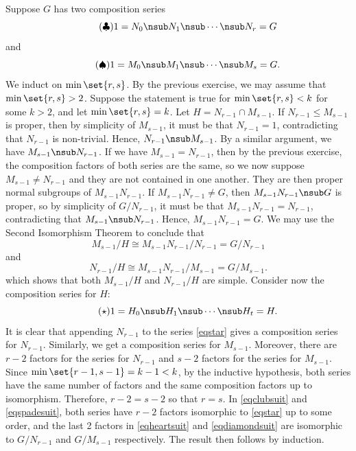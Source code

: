 \begin{sol}
    Suppose $G$ has two composition series
    \begin{equation}
        \label{eqclubsuit}
        \tag{$\clubsuit$}
        1 = N_0 \nsub N_1 \nsub \cdots \nsub N_r = G
    \end{equation}
    and
    \begin{equation}
        \label{eqspadesuit}
        \tag{$\spadesuit$}
        1 = M_0 \nsub M_1 \nsub \cdots \nsub M_s = G.
    \end{equation}
    We induct on $\min\set{r,s}$.
	By the previous exercise, we may assume that $\min\set{r, s} > 2$.
	Suppose the statement is true for $\min\set{r, s} < k$ for some $k > 2$, and let $\min\set{r, s} = k$.
	Let $H = N_{r - 1} \cap M_{s - 1}$.
	If $N_{r - 1} \leq M_{s - 1}$ is proper, then by simplicity of $M_{s - 1}$, it must be that $N_{r - 1} = 1$, contradicting that $N_{r - 1}$ is non-trivial.
	Hence, $N_{r - 1} \nsub M_{s - 1}$.
	By a similar argument, we have $M_{s - 1} \nsub N_{r - 1}$.
	If we have $M_{s - 1} = N_{r - 1}$, then by the previous exercise, the composition factors of both series are the same, so we now suppose $M_{s - 1} \neq N_{r - 1}$ and they are not contained 
    in one another.
	They are then proper normal subgroups of $M_{s - 1}N_{r - 1}$.
	If $M_{s - 1}N_{r - 1} \neq G$, then $M_{s - 1}N_{r - 1} \nsub G$ is proper, so by simplicity of $G/N_{r - 1}$, it must be that $M_{s - 1}N_{r - 1} = N_{r - 1}$, contradicting that $M_{s - 1} \nsub N_{r - 1}$.
	Hence, $M_{s - 1}N_{r - 1} = G$.
	We may use the Second Isomorphism Theorem to conclude that
    \begin{equation}
        \label{eqheartsuit}
        \tag{$\heartsuit$}
        M_{s - 1}/H \cong M_{s - 1}N_{r - 1}/N_{r - 1} = G/N_{r - 1}
    \end{equation}
    and
    \begin{equation}
        \label{eqdiamondsuit}
        \tag{$\diamondsuit$}
        N_{r - 1}/H \cong M_{s - 1}N_{r - 1}/M_{s - 1} = G/M_{s - 1}.
    \end{equation}
    which shows that both $M_{s - 1}/H$ and $N_{r - 1}/H$ are simple.
	Consider now the composition series for $H$:
    \begin{equation}
        \label{eqstar}
        \tag{$\star$}
        1 = H_0 \nsub H_1 \nsub \cdots \nsub H_t = H.
    \end{equation}
    It is clear that appending $N_{r - 1}$ to the series \eqref{eqstar} gives a composition series for $N_{r - 1}$.
	Similarly, we get a composition series for $M_{s - 1}$.
	Moreover, there are $r - 2$ factors for the series for $N_{r - 1}$ and $s - 2$ factors for the series for $M_{s - 1}$.
	Since $\min\set{r - 1, s - 1} = k - 1 < k$, by the inductive hypothesis, both series have the same number of factors and the same composition factors up to isomorphism.
	Therefore, $r - 2 = s - 2$ so that $r = s$.
	In \eqref{eqclubsuit} and \eqref{eqspadesuit}, both series have $r - 2$ factors isomorphic to \eqref{eqstar} up to some order, and the last 2 factors in \eqref{eqheartsuit} and \eqref{eqdiamondsuit} are isomorphic to $G/N_{r - 1}$ and $G/M_{s - 1}$ respectively.
	The result then follows by induction.
\end{sol}

